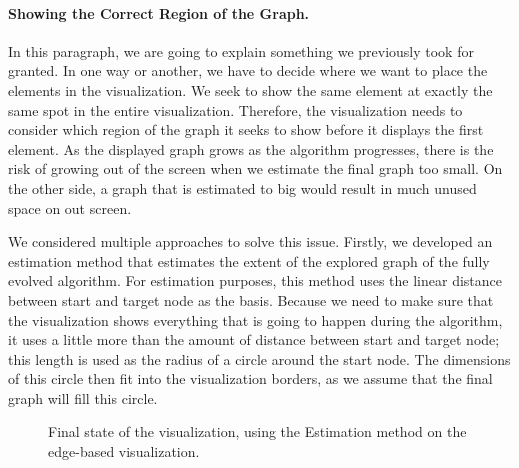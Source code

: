 \documentclass
[
    paper = a4,
    pagesize,
    12 pt,
    oneside,                       %
    open = right,
    DIV = calc,
    BCOR = 0 mm,                   %
    bibtotoc
]
{scrbook}
\begin{document}
\paragraph{Showing the Correct Region of the Graph.}
In this paragraph, we are going to explain something we previously took for granted.
In one way or another, we have to decide where we want to place the elements in the visualization.
We seek to show the same element at exactly the same spot in the entire visualization.
Therefore, the visualization needs to consider which region of the graph it seeks to show before it displays the first element.
As the displayed graph grows as the algorithm progresses, there is the risk of growing out of the screen when we estimate the final graph too small.
On the other side, a graph that is estimated to big would result in much unused space on out screen.

%

We considered multiple approaches to solve this issue.
Firstly, we developed an estimation method that estimates the extent of the explored graph of the fully evolved algorithm.
For estimation purposes, this method uses the linear distance between start and target node as the basis.
Because we need to make sure that the visualization shows everything that is going to happen during the algorithm, it uses a little more than the amount of distance between start and target node; this length is used as the radius of a circle around the start node.
The dimensions of this circle then fit into the visualization borders, as we assume that the final graph will fill this circle.

\begin{figure}
\caption[]{Final state of the visualization, using the Estimation method on the edge-based visualization.}
\label{fig:estimation}
\end{figure}
\end{document}
